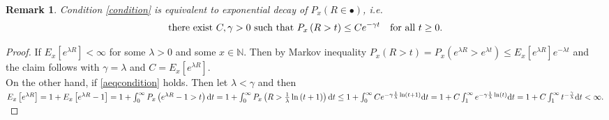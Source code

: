 \documentclass[12pt,a4paper]{scrartcl}
\newtheorem {remark}[theorem]{Remark}
\numberwithin{equation}{section}
\newcommand{\N}{\mathbb{N}} %
\begin{document}
\begin{remark}
\label{tailofR}
Condition \eqref{condition} is equivalent to exponential decay of $ P_{x} \left(R \in \bullet \right) $, i.e.
\begin{equation}
\text{there exist $C,\gamma > 0$ such that  } P_{x} \left(R > t \right) \leq C e^{-\gamma t} \ \ \textnormal{ for all } t \geq 0.
\label{aeqcondition}
\end{equation}
\end{remark}
\begin{proof}
If $E_{x}\left[ e^{\lambda R} \right] < \infty$ for some $\lambda >0$ and some $ x \in \N$. Then by Markov inequality $P_{x} \left( R > t\right) = P_{x} \left(e^{\lambda R} > e^{\lambda t} \right) \leq E_{x}\left[e^{\lambda R} \right] e^{-\lambda t}$ and the claim follows with $\gamma = \lambda$ and $ C = E_{x} \left[e^{\lambda R}\right]$.\\
On the other hand, if \eqref{aeqcondition} holds. Then let $ \lambda < \gamma $ and then $E_{x}\left[ e^{\lambda R} \right] = 1 + E_{x}\left[ e^{\lambda R} -1 \right] = 1 + \int_{0}^{\infty} P_{x}\left(e^{\lambda R} - 1 > t\right) \textnormal{d}t = 1+\int_{0}^{\infty} P_{x}\left( R > \frac{1}{\lambda} \ln\left(t+1\right)\right) \textnormal{d}t \leq 1+ \int_{0}^{\infty} C e^{-\gamma \frac{1}{\lambda} \ln\left(t+1\right)} \textnormal{d}t = 1+ C \int_{1}^{\infty} e^{-\gamma \frac{1}{\lambda} \ln\left(t\right)} \textnormal{d}t = 1 + C \int_{1}^{\infty} t^{-\frac{\gamma}{\lambda}} \textnormal{d}t < \infty. $
\end{proof}
\end{document}
